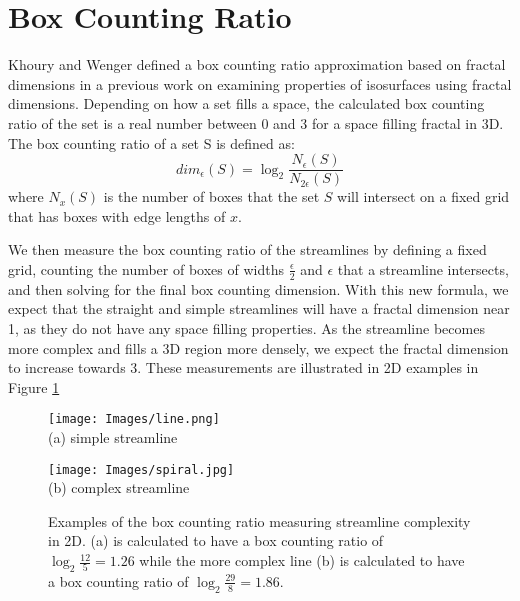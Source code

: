 \documentclass{egpubl}
\begin{document}
\section{Box Counting Ratio} \label{sec:bcr}

Khoury and Wenger \cite{khoury} defined a box counting ratio approximation based on fractal dimensions in a previous work on examining properties of isosurfaces using fractal dimensions.
Depending on how a set fills a space, the calculated box counting ratio of the set is a real number between 0 and 3 for a space filling fractal in 3D.
The box counting ratio of a set S is defined as:
\begin{equation} dim_{\epsilon}(S) = \log_2\frac{N_{\epsilon}(S)}{N_{2\epsilon}(S)}\end{equation}
where $N_{x}(S)$ is the number of boxes that the set $S$ will intersect on a fixed grid that has boxes with edge lengths of $x$.

We then measure the box counting ratio of the streamlines by defining a fixed grid, counting the number of boxes of widths $\frac{\epsilon}{2}$ and ${\epsilon}$ that a streamline intersects, and then solving for the final box counting dimension.
With this new formula, we expect that the straight and simple streamlines will have a fractal dimension near 1, as they do not have any space filling properties.
As the streamline becomes more complex and fills a 3D region more densely, we expect the fractal dimension to increase towards 3.
These measurements are illustrated in 2D examples in Figure \ref{fig:box_counting_calcs}

\begin{figure}[h]
        \centering
                \begin{minipage}{0.49\linewidth}
                        \small \centering
                        \texttt{[image: Images/line.png]} \\ (a) simple streamline
                \end{minipage}
                \begin{minipage}{0.49\linewidth}
                        \small \centering
                        \texttt{[image: Images/spiral.jpg]} \\ (b) complex streamline
                \end{minipage}
        \caption{Examples of the box counting ratio measuring streamline complexity in 2D. (a) is calculated to have a box counting ratio of  $\log_2\frac{12}{5} = 1.26$ while the more complex line (b) is calculated to have a box counting ratio of $\log_2\frac{29}{8} = 1.86$.}
        \label{fig:box_counting_calcs}
\end{figure}
\end{document}
